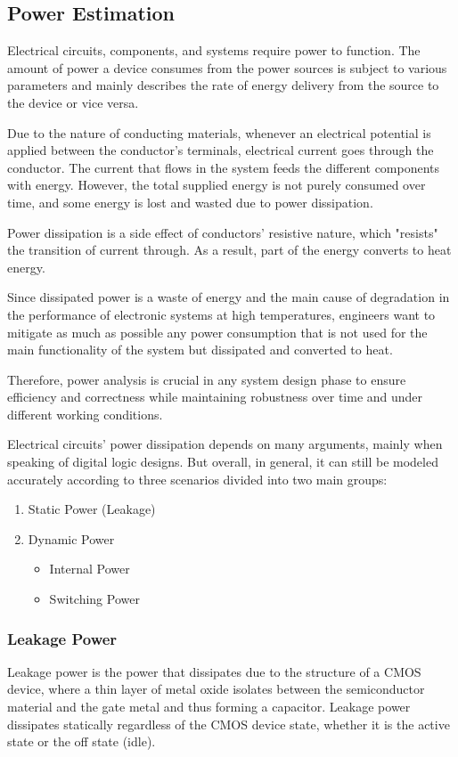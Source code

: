 \subsection{Power Estimation}
Electrical circuits, components, and systems require power to function.
The amount of power a device consumes from the power sources is subject 
to various parameters and mainly describes the rate of energy delivery 
from the source to the device or vice versa.

Due to the nature of conducting materials, 
whenever an electrical potential is applied
between the conductor's terminals, 
electrical current goes through the conductor.
The current that flows
in the system feeds the different components with energy. 
However, the total supplied energy is not purely consumed over time, 
and some energy is lost and wasted due to power dissipation.

Power dissipation is a side effect of conductors' resistive nature, 
which "resists" the transition of current through.
As a result, part of the energy converts 
to heat energy.

Since dissipated power is a waste of energy and the main cause 
of degradation in the performance of electronic systems at high temperatures,
engineers want to mitigate as much as possible any power
consumption that is not used for the main functionality of the system but
dissipated and converted to heat.

Therefore, power analysis is crucial in any system 
design phase to ensure efficiency and correctness while maintaining 
robustness over time and under different working conditions.

Electrical circuits' power dissipation depends on many arguments, 
mainly when speaking of digital logic designs. 
But overall, in general, it can still be modeled 
accurately according to three scenarios divided into two main groups:
\begin{enumerate}
    \item Static Power (Leakage)
    \item Dynamic Power
    \begin{itemize}
        \item Internal Power
        \item Switching Power
    \end{itemize}
\end{enumerate}

\subsubsection{Leakage Power}
Leakage power is the power that dissipates due to the 
structure of a CMOS device, 
where a thin layer of metal oxide isolates
between the semiconductor material and the
gate metal and thus forming a capacitor. 
Leakage power dissipates statically regardless of the CMOS 
device state, 
whether it is the active state or the off state (idle).

